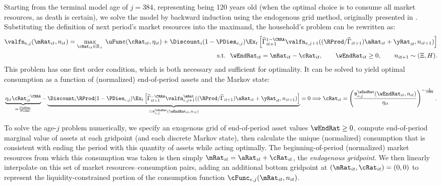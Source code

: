 \documentclass[./ConsumptionResponse]{subfiles}
\begin{document}
Starting from the terminal model age of $j=384$, representing being 120 years old (when the optimal choice is to consume all market resources, as death is certain), we solve the model by backward induction using the endogenous grid method, originally presented in \cite{carroll_EGM}.
Substituting the definition of next period's market resources into the maximand, the household's problem can be rewritten as:
\begin{eqnarray*}
  \valfn_{e,j}(\mRat_{it}, n_{it}) = \underset{\cRat_{it} \in \mathbb{R}_+}{\max } ~ \uFunc(\cRat_{it}, \eta_{it}) + \Discount_{i} (1-\PDies_{e,j}) \Ex_{t}\left[ \widehat{\Gamma}_{it+1}^{1-\CRRA} \valfn_{e,j+1}((\RProd / \widehat{\Gamma}_{it+1}) \aRat_{it} + \yRat_{it}, n_{it+1}) \right] \\
  \text{s.t.~~} \wEndRat_{it} =\mRat_{it}-\cRat_{it}, \qquad \wEndRat_{it} \geq 0, \qquad n_{it+1} \sim (\Xi,H).
\end{eqnarray*}
This problem has one first order condition, which is both necessary and sufficient for optimality.
It can be solved to yield optimal consumption as a function of (normalized) end-of-period assets and the Markov state:
\begin{equation*}
  \underbrace{\eta_{it} \cRat_{it}^{-\CRRA}}_{=\frac{\partial \uFunc}{\partial \cRat}} - \underbrace{\Discount_i \RProd (1-\PDies_{e,j}) \Ex_{t}\left[ \widehat{\Gamma}_{it+1}^{-\CRRA} \valfn^{\mRat}_{e,j+1}((\RProd / \widehat{\Gamma}_{it+1}) \aRat_{it} + \yRat_{it}, n_{it+1}) \right]}_{\equiv \mathfrak{v}^{\wEndRat}_{e,j}(\wEndRat_{it}, n_{it})} = 0 \Longrightarrow \cRat_{it} = \left( \frac{\mathfrak{v}^{\wEndRat}_{e,j} (\wEndRat_{it}, n_{it})} {\eta_{it}} \right) ^{-\frac{1}{\CRRA}}.
\end{equation*}

To solve the age-$j$ problem numerically, we specify an exogenous grid of end-of-period asset values $\wEndRat \geq 0$, compute end-of-period marginal value of assets at each gridpoint (and each discrete Markov state), then calculate the unique (normalized) consumption that is consistent with ending the period with this quantity of assets while acting optimally.
The beginning-of-period (normalized) market resources from which this consumption was taken is then simply $\mRat_{it} = \aRat_{it} + \cRat_{it}$, the \textit{endogenous gridpoint}.
We then linearly interpolate on this set of market resources--consumption pairs, adding an additional bottom gridpoint at $(\mRat_{it},\cRat_{it})=(0,0)$ to represent the liquidity-constrained portion of the consumption function $\cFunc_{e,j}(\mRat_{it}, n_{it})$.
\end{document}
